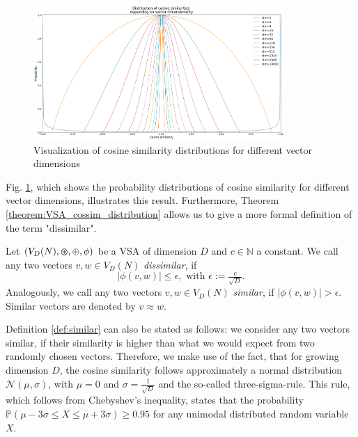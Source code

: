 \begin{figure}[t!]
	\centering
	\includegraphics[width=0.85\textwidth]{imgs/distributions_cosine_sims.eps}
	\caption{Visualization of cosine similarity distributions for different vector dimensions }
	\label{fig:cosine_dist}
\end{figure}
Fig. \ref{fig:cosine_dist}, which shows the probability distributions of cosine similarity for different vector dimensions, illustrates this result. 
Furthermore, Theorem \ref{theorem:VSA_cossim_distribution} allows us to give a more formal definition of the term "dissimilar".
\begin{defn}
	\label{def:similar}
	Let $(V_{D}(N), \varoast, \oplus, \phi)$ be a \acrfull{VSA} of dimension $D$ and $c \in \mathbb{N}$ a constant. We call any two vectors $v, w \in V_{D}(N)$ \emph{dissimilar}, if 
	\[ 
	\left| \phi(v,w) \right| \leq \epsilon, \textrm{ with } \epsilon:=\tfrac{c}{\sqrt{D}}.
	\]
	Analogously, we call any two vectors $v, w \in V_{D}(N)$ \emph{similar}, if	$\left| \phi(v,w) \right| > \epsilon$. 
	Similar vectors are denoted by $v \approx w$. \\
\end{defn}
Definition \ref{def:similar} can also be stated as follows: we consider any two vectors similar, if their similarity is higher than what we would expect from two randomly chosen vectors.
Therefore, we make use of the fact, that for growing dimension $D$, the cosine similarity follows approximately a normal distribution $\mathcal{N}\left(\mu, \sigma\right)$, with $\mu=0$ and $\sigma=\tfrac{1}{\sqrt{D}}$ and the so-called three-sigma-rule.
This rule, which follows from Chebyshev's inequality, states that the probability $\mathbb{P}\left(\mu-3\sigma \leq X \leq \mu+3\sigma \right) \geq 0.95$ for any unimodal distributed random variable $X$.
